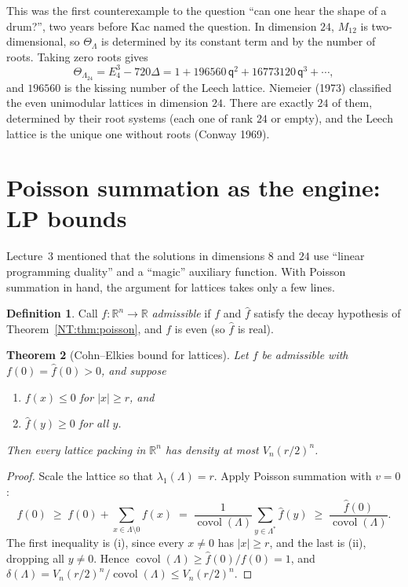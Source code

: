 \documentclass[11pt,openany]{book}
\theoremstyle{plain}
\newtheorem{theorem}{Theorem}[chapter]
\theoremstyle{definition}
\newtheorem{definition}[theorem]{Definition}
\theoremstyle{remark}
\newcommand{\R}{\mathbb{R}}
\newcommand{\Lat}{\Lambda}             %
\newcommand{\covol}{\operatorname{covol}}
\newcommand{\abs}[1]{\left\lvert #1 \right\rvert}
\newcommand{\dens}{\delta}             %
\begin{document}
This was the first counterexample to the question ``can one hear the shape of a drum?'', two years
before Kac named the question. In dimension $24$, $M_{12}$ is two-dimensional, so $\Theta_\Lat$ is
determined by its constant term and by the number of roots. Taking zero roots gives
\[
  \Theta_{\Lambda_{24}}=E_4^3-720\Delta=1+196560\,\mathsf q^2+16773120\,\mathsf q^3+\cdots,
\]
and $196560$ is the kissing number of the Leech lattice. Niemeier (1973) classified the even unimodular
lattices in dimension $24$. There are exactly $24$ of them, determined by their root systems (each one of
rank $24$ or empty), and the Leech lattice is the unique one without roots (Conway 1969).

\section{Poisson summation as the engine: LP bounds}
\label{NT:sec:LP}

Lecture~3 mentioned that the solutions in dimensions $8$ and $24$ use ``linear programming duality'' and a
``magic'' auxiliary function. With Poisson summation in hand, the argument for lattices takes only a few lines.

\begin{definition}
Call $f\colon\R^n\to\R$ \emph{admissible} if $f$ and $\hat f$ satisfy the decay hypothesis of
Theorem~\ref{NT:thm:poisson}, and $f$ is even (so $\hat f$ is real).
\end{definition}

\begin{theorem}[Cohn--Elkies bound for lattices]\label{NT:thm:CElattice}
Let $f$ be admissible with $f(0)=\hat f(0)>0$, and suppose
\begin{enumerate}[label=(\roman*),nosep]
\item $f(x)\le0$ for $\abs x\ge r$, and
\item $\hat f(y)\ge0$ for all $y$.
\end{enumerate}
Then every lattice packing in $\R^n$ has density at most $V_n(r/2)^n$.
\end{theorem}

\begin{proof}
Scale the lattice so that $\lambda_1(\Lat)=r$. Apply Poisson summation with $v=0$:
\[
  f(0)\;\ge\;f(0)+\sum_{x\in\Lat\setminus0}f(x)\;=\;\frac{1}{\covol(\Lat)}\sum_{y\in\Lat^*}\hat f(y)
  \;\ge\;\frac{\hat f(0)}{\covol(\Lat)}.
\]
The first inequality is (i), since every $x\ne0$ has $\abs x\ge r$, and the last is (ii), dropping
all $y\ne0$. Hence $\covol(\Lat)\ge\hat f(0)/f(0)=1$, and $\dens(\Lat)=V_n(r/2)^n/\covol(\Lat)\le V_n(r/2)^n$.
\end{proof}
\end{document}
